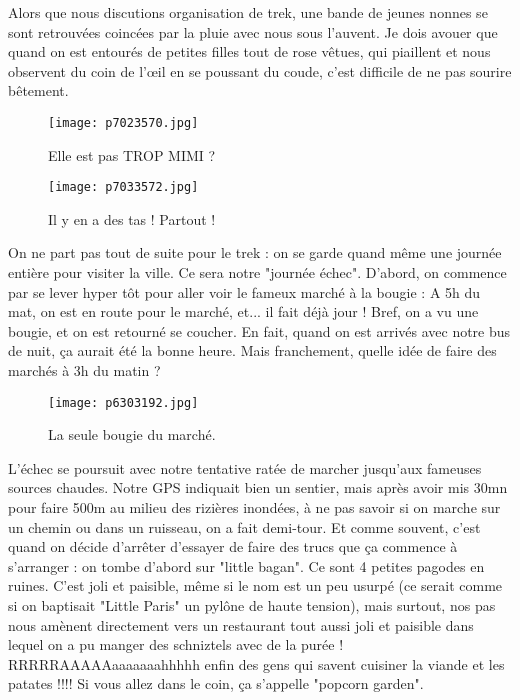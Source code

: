 \documentclass{book}
\begin{document}
Alors que nous discutions organisation de trek, une bande de jeunes nonnes se sont retrouvées coincées par la pluie avec nous sous l'auvent. Je dois avouer que quand on est entourés de petites filles tout de rose vêtues, qui piaillent et nous observent du coin de l’œil en se poussant du coude, c'est difficile de ne pas sourire bêtement.


\begin{figure}[h]
\centering
\texttt{[image: p7023570.jpg]}
\caption*{Elle est pas TROP MIMI ?}
\end{figure}


\begin{figure}[h]
\centering
\texttt{[image: p7033572.jpg]}
\caption*{Il y en a des tas ! Partout !}
\end{figure}

On ne part pas tout de suite pour le trek : on se garde quand même une journée entière pour visiter la ville. Ce sera notre "journée échec". D'abord, on commence par se lever hyper tôt pour aller voir le fameux marché à la bougie : A 5h du mat, on est en route pour le marché, et... il fait déjà jour ! Bref, on a vu une bougie, et on est retourné se coucher. En fait, quand on est arrivés avec notre bus de nuit, ça aurait été la bonne heure. Mais franchement, quelle idée de faire des marchés à 3h du matin ?


\begin{figure}[h]
\centering
\texttt{[image: p6303192.jpg]}
\caption*{La seule bougie du marché.}
\end{figure}

L'échec se poursuit avec notre tentative ratée de marcher jusqu'aux fameuses sources chaudes. Notre GPS indiquait bien un sentier, mais après avoir mis 30mn pour faire 500m au milieu des rizières inondées, à ne pas savoir si on marche sur un chemin ou dans un ruisseau, on a fait demi-tour. Et comme souvent, c'est quand on décide d'arrêter d'essayer de faire des trucs que ça commence à s'arranger : on tombe d'abord sur "little bagan". Ce sont 4 petites pagodes en ruines. C'est joli et paisible, même si le nom est un peu usurpé (ce serait comme si on baptisait "Little Paris" un pylône de haute tension), mais surtout, nos pas nous amènent directement vers un restaurant tout aussi joli et paisible dans lequel on a pu manger des schniztels avec de la purée ! RRRRRAAAAAaaaaaaahhhhh enfin des gens qui savent cuisiner la viande et les patates !!!! Si vous allez dans le coin, ça s'appelle "popcorn garden".
\end{document}
